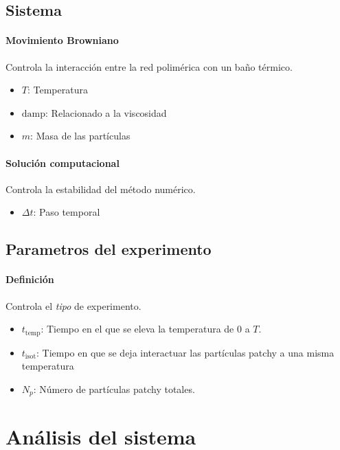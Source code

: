 \documentclass[../main.tex]{subfiles}
\begin{document}
\subsection{Sistema}

\paragraph{Movimiento Browniano}
Controla la interacción entre la red polimérica con un baño térmico.

\begin{itemize}
    \item \(T\): Temperatura 
    \item \(\mathrm{damp}\): Relacionado a la viscosidad
    \item \(m\): Masa de las partículas
\end{itemize}

\paragraph{Solución computacional}
Controla la estabilidad del método numérico.

\begin{itemize}
    \item \(\Delta t\): Paso temporal 
\end{itemize}

\subsection{Parametros del experimento}

\paragraph{Definición}
Controla el \emph{tipo} de experimento.

\begin{itemize}
    \item \(t_{\mathrm{temp}}\): Tiempo en el que se eleva la temperatura de \(0\) a \(T\).
    \item \(t_{\mathrm{isot}}\): Tiempo en que se deja interactuar las partículas patchy a una misma temperatura
    \item \(N_p\): Número de partículas patchy totales.
\end{itemize}



\section{Análisis del sistema}
\end{document}
